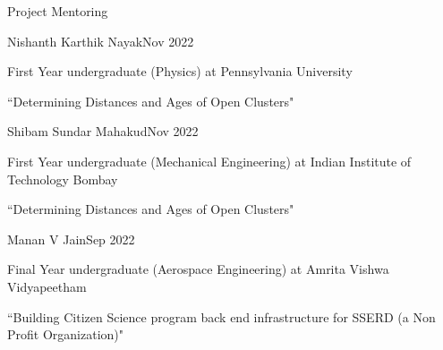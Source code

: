 \begin{rSection}{Project Mentoring}
\hspace{-1.2em}\begin{rSubsection}{Nishanth Karthik Nayak}{Nov 2022}{}{}
\vspace{-0.5em}
\item []First Year undergraduate (Physics) at Pennsylvania University 
\item []``Determining Distances and Ages of Open Clusters"
\end{rSubsection}

\vspace{-0.5em}

\hspace{-1.2em}\begin{rSubsection}{Shibam Sundar Mahakud}{Nov 2022}{}{}
\vspace{-0.5em}
\item []First Year undergraduate (Mechanical Engineering) at Indian Institute of Technology Bombay
\item []``Determining Distances and Ages of Open Clusters"
\end{rSubsection}

\vspace{-0.5em}

\hspace{-1.2em}\begin{rSubsection}{Manan V Jain}{Sep 2022}{}{}
\vspace{-0.5em}
\item []Final Year undergraduate (Aerospace Engineering) at Amrita Vishwa Vidyapeetham
\item []``Building Citizen Science program back end infrastructure for SSERD (a Non Profit Organization)"
\end{rSubsection}
\end{rSection}